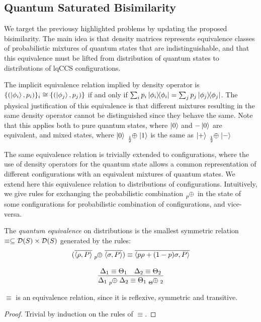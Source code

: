 
\subsection{Quantum Saturated Bisimilarity}

We target the previousy highlighted problems by updating the proposed bisimilarity. The main idea is that density matrices represents equivalence classes of probabilistic mixtures of quantum states that are indistinguishable, and that this equivalence must be lifted from distribution of quantum states to distributions of lqCCS configurations.

The implicit equivalence relation implied by density operator is $\{(\ket{\phi_i}, p_i)\}_i \cong \{(\ket{\phi_j}, p_j)\}$ if and only if $\sum_{i} p_i \ket{\phi_i}\!\!\bra{\phi_i} = \sum_{j} p_j \ket{\phi_j}\!\!\bra{\phi_j}$.
The physical justification of this equivalence is that different mixtures resulting in the same density operator cannot be distinguished since they behave the same. Note that this applies both to pure quantum states, where $\ket{0}$ and $-\ket{0}$ are equivalent, and  mixed states, where $\kz \psum{\frac{1}{2}} \ko$ is the same as $\kpl \psum{\frac{1}{2}} \km$

The same equivalence relation is trivially extended to configurations, where the use of density operators for the quantum state allows a common representation of different configurations with an equivalent mixtures of quantum states. 
We extend here this equivalence relation to distributions of configurations.
Intuitively, we give rules for exchanging the probabilistic combination $\psum{p}$ in the state of some configurations for probabilistic combination of configurations, and vice-versa. 

\begin{definition}
	The \emph{quantum equivalence} on distributions is the smallest  symmetric relation  $\equiv \subseteq \mathcal{D}(S) \times \mathcal{D}(S)$ generated by the rules:
	\begin{gather*}
	(\overline{\confw{\rho, P}} \psum{p} \overline{\confw{\sigma, P}}) \equiv \overline{\confw{p \rho + (1-p)\sigma, P}}
	\\[0.3cm]
	\infer{\Delta_1 \psum{p} \Delta_2 \equiv \Theta_1 \psum \Theta_2}{\Delta_1 \equiv \Theta_1 & \Delta_2 \equiv \Theta_2}
	\end{gather*}
	\end{definition}
	
	\begin{theorem}
	$\equiv$ is an equivalence relation, since it is reflexive, symmetric and transitive.
	\end{theorem}
	\begin{proof}
	Trivial by induction on the rules of $\equiv$.
	\end{proof}


